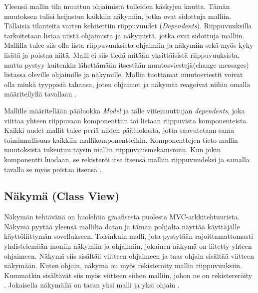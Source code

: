\documentclass[finnish,utf8,nonumbib,palatino,kandi]{gradu2}
\begin{document}
Yleensä mallin tila muuttuu ohjaimista tulleiden käskyjen kautta. Tämän muutoksen tulisi heijastua kaikkiin näkymiin, jotka ovat sidottuja malliin. Tällaisia tilanteita varten kehitettiin riippuvuudet (\emph{Dependents}).
Riippuvuuksilla tarkoitetaan listaa niistä ohjaimista ja näkymistä, jotka ovat sidottuja malliin. Mallilla tulee siis olla lista riippuvuuksista ohjaimiin ja näkymiin sekä myös kyky lisätä ja poistaa niitä. Malli ei siis tiedä mitään yksittäisistä riippuvuuksista, mutta pystyy kuitenkin lähettämään itsestään muutosviestejä(change messages) listassa oleville ohjaimille ja näkymille. Mallin tuottamat muutosviestit voivat olla minkä tyyppisiä tahansa, joten ohjaimet ja näkymät reagoivat niihin omalla määritellyllä tavallaan  \cite{Krasner[s. 27]}. 

Mallille määritellään pääluokka \emph{Model} ja tälle viitemuuttujan \emph{dependents}, joka viittaa yhteen riippuvaan komponenttiin tai listaan riippuvista komponenteista. Kaikki uudet mallit tulee periä niiden pääluokasta, jotta saavutetaan sama toiminnallisuus kaikkiin mallikomponentteihin. Komponenttejen tieto mallin muutoksista tukeutuu täysin mallin riippuvuusmekanismiin. Kun jokin komponentti luodaan, se rekisteröi itse itsensä malliin riippuvuudeksi ja samalla tavalla se myös poistaa itsensä \cite{Burbeck}.

\subsection{Näkymä (Class View)}
Näkymän tehtävänä on huolehtia graafisesta puolesta MVC-arkkitehtuurista. Näkymä pyytää yleensä mallilta datan ja tämän pohjalta näyttää käyttäjälle käyttöliittymän sovellukseen. Toisinkuin malli, jota pystytään rajoittamattomasti yhdistelemään moniin näkymiin ja ohjaimiin, jokainen näkymä on liitetty yhteen ohjaimeen.  Näkymä siis sisältää viitteen ohjaimeen ja taas ohjain sisältää viitteen näkymään. Kuten ohjain, näkymä on myös rekisteröity mallin riippuvuuksiin. Kummatkin sisältävät siis myös viitteen siihen malliin, johon ne on rekistereröity \cite{Burbeck}. Jokaisella näkymällä on tasan yksi malli ja yksi ohjain \cite{Krasner[s.29]}.  
\end{document}
